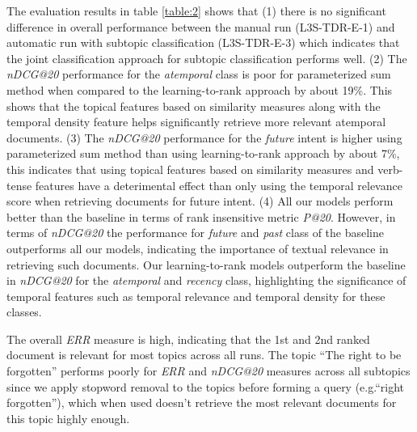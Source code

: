 \documentclass{sig-alternate}
\begin{document}
The evaluation results in table \ref{table:2} shows that (1) there is no significant difference in overall performance between the manual run (\textsf{L3S-TDR-E-1}) and automatic run with subtopic classification (\textsf{L3S-TDR-E-3}) which indicates that the joint classification approach for subtopic classification performs well. (2) The \textit{nDCG@20} performance for the \textit{atemporal} class is poor for parameterized sum method when compared to the learning-to-rank approach by about 19\%. This shows that the topical features based on similarity measures along with the temporal density feature helps significantly retrieve more relevant atemporal documents. (3) The \textit{nDCG@20} performance for the \textit{future} intent is higher using parameterized sum method than using learning-to-rank approach by about 7\%, this indicates that using topical features based on similarity measures and verb-tense features have a deterimental effect than only using the temporal relevance score when retrieving documents for future intent. (4) All our models perform better than the baseline in terms of rank insensitive metric \textit{P@20}. However, in terms of \textit{nDCG@20} the performance for \textit{future} and \textit{past} class of the baseline outperforms all our models, indicating the importance of textual relevance in retrieving such documents. Our learning-to-rank models outperform the baseline in \textit{nDCG@20} for the \textit{atemporal} and \textit{recency} class, highlighting the significance of temporal features such as temporal relevance and temporal density for these classes. 

The overall \textit{ERR} measure is high, indicating that the 1st and 2nd ranked document is relevant for most topics across all runs. The topic ``The right to be forgotten'' performs poorly for \textit{ERR} and \textit{nDCG@20} measures across all subtopics since we apply stopword removal to the topics before forming a query (e.g.``right forgotten''), which when used doesn't retrieve the most relevant documents for this topic highly enough.
\end{document}
